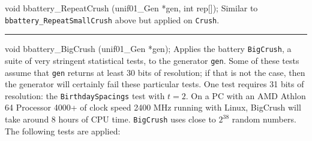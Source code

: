 \code


void bbattery_RepeatCrush (unif01_Gen *gen, int rep[]);
\endcode
  \tab Similar to {\tt bbattery\_RepeatSmallCrush} above but applied on
  {\tt Crush}.
  \endtab
\bigskip

\hrule
\code


void bbattery_BigCrush (unif01_Gen *gen);
\endcode
  \tab
  Applies the battery {\tt BigCrush}, a suite of very stringent statistical
  tests, to the generator {\tt gen}.
  Some of these tests assume that {\tt gen} returns at least 30 bits of
  resolution; if that is not the case, then the generator will certainly
  fail these particular tests. One test requires 31 bits of resolution:
  the {\tt BirthdaySpacings} test with $t=2$.
  On a PC with an AMD Athlon 64 Processor 4000+
  of clock speed 2400 MHz running with Linux, BigCrush
  will take around 8 hours of CPU time. {\tt BigCrush} uses close to
  $2^{38}$ random numbers.
  The following tests are applied:\label{bat:BigCrush}
  \endtab

